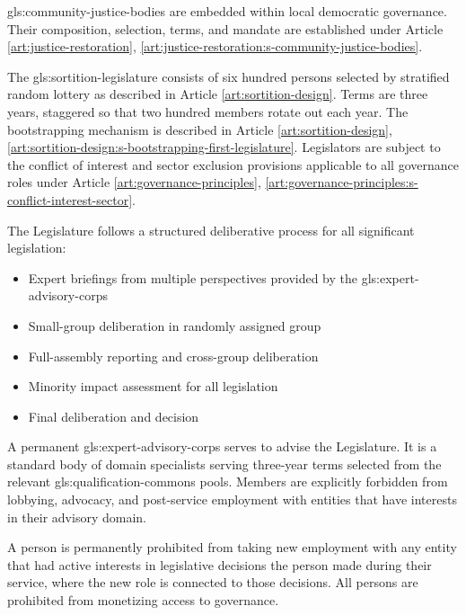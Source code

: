 \gls{gls:community-justice-bodies} are embedded within local democratic governance. Their composition, selection, terms, and mandate are established under Article \ref{art:justice-restoration}, \ref{art:justice-restoration:s-community-justice-bodies}.


The \gls{gls:sortition-legislature} consists of six hundred persons selected by stratified random lottery as described in Article \ref{art:sortition-design}. Terms are three years, staggered so that two hundred members rotate out each year. The bootstrapping mechanism is described in Article \ref{art:sortition-design}, \ref{art:sortition-design:s-bootstrapping-first-legislature}. Legislators are subject to the conflict of interest and sector exclusion provisions applicable to all governance roles under Article \ref{art:governance-principles}, \ref{art:governance-principles:s-conflict-interest-sector}.

The Legislature follows a structured deliberative process for all significant legislation:
\begin{itemize}
  \item Expert briefings from multiple perspectives provided by the \gls{gls:expert-advisory-corps}
  \item Small-group deliberation in randomly assigned group
  \item Full-assembly reporting and cross-group deliberation
  \item Minority impact assessment for all legislation
  \item Final deliberation and decision
\end{itemize}

A permanent \gls{gls:expert-advisory-corps} serves to advise the Legislature. It is a standard body of domain specialists serving three-year terms selected from the relevant \gls{gls:qualification-commons} pools. Members are explicitly forbidden from lobbying, advocacy, and post-service employment with entities that have interests in their advisory domain.

A person is permanently prohibited from taking new employment with any entity that had active interests in legislative decisions the person made during their service, where the new role is connected to those decisions. All persons are prohibited from monetizing access to governance.


